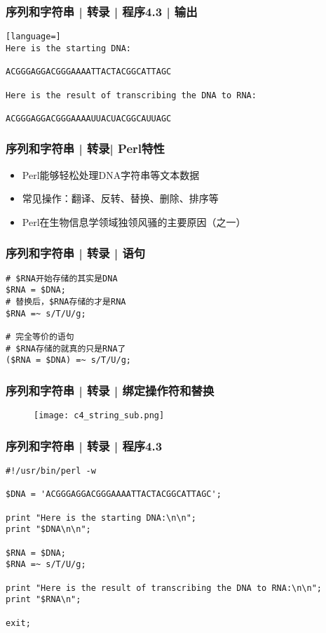 \begin{frame}[fragile]
  \frametitle{序列和字符串 | 转录 | 程序4.3 | 输出}
  \vspace{-1.5em}
\begin{lstlisting}[language=]
Here is the starting DNA:

ACGGGAGGACGGGAAAATTACTACGGCATTAGC

Here is the result of transcribing the DNA to RNA:

ACGGGAGGACGGGAAAAUUACUACGGCAUUAGC
\end{lstlisting}
\end{frame}

\begin{frame}
  \frametitle{序列和字符串 | 转录| Perl特性}
  \begin{itemize}
    \item Perl能够轻松处理DNA字符串等文本数据
    \item 常见操作：翻译、反转、替换、删除、排序等
    \item Perl在生物信息学领域独领风骚的主要原因（之一）
  \end{itemize}
\end{frame}

\begin{frame}[fragile]
  \frametitle{序列和字符串 | 转录 | \alert{语句}}
  \vspace{-1.5em}
\begin{lstlisting}
# $RNA开始存储的其实是DNA
$RNA = $DNA;
# 替换后，$RNA存储的才是RNA
$RNA =~ s/T/U/g;

# 完全等价的语句
# $RNA存储的就真的只是RNA了
($RNA = $DNA) =~ s/T/U/g;
\end{lstlisting}
\end{frame}

\begin{frame}
  \frametitle{序列和字符串 | 转录 | \alert{绑定操作符和替换}}
  \begin{figure}
    \centering
    \texttt{[image: c4\_string\_sub.png]}
  \end{figure}
\end{frame}

\begin{frame}[fragile]
  \frametitle{序列和字符串 | 转录 | \alert{程序4.3}}
  \vspace{-1.5em}
\begin{lstlisting}
#!/usr/bin/perl -w

$DNA = 'ACGGGAGGACGGGAAAATTACTACGGCATTAGC';

print "Here is the starting DNA:\n\n";
print "$DNA\n\n";

$RNA = $DNA;
$RNA =~ s/T/U/g;

print "Here is the result of transcribing the DNA to RNA:\n\n";
print "$RNA\n";

exit;
\end{lstlisting}
\end{frame}


